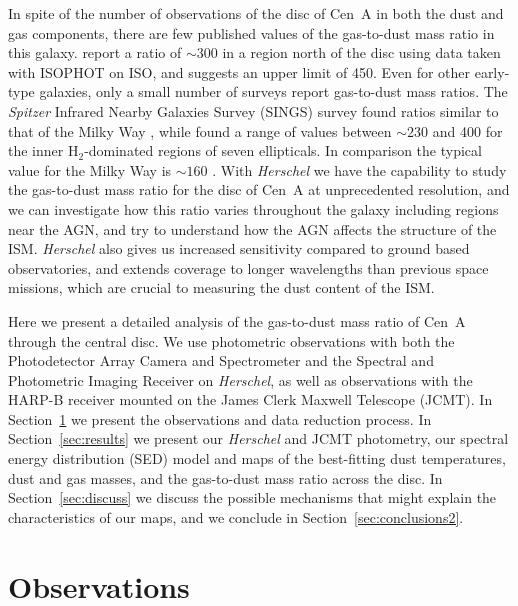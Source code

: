 In spite of the number of observations of the disc of Cen~A in both the dust and gas components, there are few published values of the gas-to-dust mass ratio in this galaxy.  \citet{2004A&A...415...95S} report a ratio of $\sim 300$ in a region north of the disc using data taken with ISOPHOT on ISO, and \citet{1998A&ARv...8..237I} suggests an upper limit of 450.  Even for other early-type galaxies, only a small number of surveys report gas-to-dust mass ratios.  The \emph{Spitzer} Infrared Nearby Galaxies Survey (SINGS) survey found ratios similar to that of the Milky Way \citep{2007ApJ...663..866D}, while \citet{2008ApJ...677..249L} found a range of values between $\sim 230$ and 400 for the inner H$_{2}$-dominated regions of seven ellipticals.  In comparison the typical value for the Milky Way is $\sim 160$ \citep[e.g.][]{2004ApJS..152..211Z}.  With \emph{Herschel} we have the capability to study the gas-to-dust mass ratio for the disc of Cen~A at unprecedented resolution, and we can investigate how this ratio varies throughout the galaxy including regions near the AGN, and try to understand how the AGN affects the structure of the ISM.  \emph{Herschel} also gives us increased sensitivity compared to ground based observatories, and extends coverage to longer wavelengths than previous space missions, which are crucial to measuring the dust content of the ISM.

Here we present a detailed analysis of the gas-to-dust mass ratio of Cen~A through the central disc.  We use photometric observations with both the Photodetector Array Camera and Spectrometer \citep[PACS;][]{2010A&A...518L...2P} and the Spectral and Photometric Imaging Receiver \citep[SPIRE;][]{2010A&A...518L...3G} on \emph{Herschel}, as well as observations with the HARP-B receiver mounted on the James Clerk Maxwell Telescope (JCMT). In Section~\ref{sec:obs} we present the observations and data reduction process.  In Section~\ref{sec:results} we present our \emph{Herschel} and JCMT photometry, our spectral energy distribution (SED) model and maps of the best-fitting dust temperatures, dust and gas masses, and the gas-to-dust mass ratio across the disc. In Section~\ref{sec:discuss} we discuss the possible mechanisms that might explain the characteristics of our maps, and we conclude in Section~\ref{sec:conclusions2}. 

\section{Observations}\label{sec:obs}
